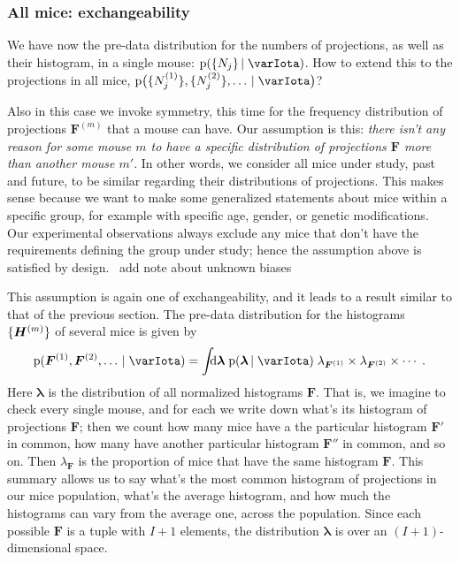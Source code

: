 \documentclass[\ifafour a4paper,12pt,\else a5paper,10pt,\fi%
onecolumn,oneside,article,%
british%
]{memoir}
\theoremstyle{remark}
\theoremstyle{innote}
\newcommand*{\di}{\mathrm{d}}%
\newcommand*{\pf}{\mathrm{p}}%
\renewcommand*{\|}[1][]{\nonscript\,#1\vert\nonscript\;\mathopen{}}
\newcommand*{\puzzle}{{\fontencoding{U}\fontfamily{fontawesometwo}\selectfont\symbol{225}}}
\newcommand{\mynote}[1]{ {\color{notecolour}\puzzle\ #1}}
\newcommand*{\yI}{\varIota}
\newcommand*{\yF}{\bm{F}}
\newcommand*{\yFm}[1][m]{\yF^{(#1)}}
\newcommand*{\yH}{\bm{H}}
\newcommand*{\yHm}[1][m]{\yH^{(#1)}}
\newcommand*{\yNm}[1][m]{N^{(#1)}}
\newcommand*{\yll}{\lambda}
\newcommand*{\yl}{\bm{\yll}}
\DeclarePairedDelimiter\tu{\{}{\}}
\begin{document}
\subsubsection{All mice: exchangeability}
\label{sec:allmice_exch}

We have now the pre-data distribution for the numbers of projections, as
well as their histogram, in a single mouse: $\pf(\tu{N_{j}} \| \yI)$. How
to extend this to the projections in all mice,
$\pf\bigl(\tu{\yNm[1]_{j}}, \tu{\yNm[2]_{j}}, \dotsc \| \yI\bigr)$?

Also in this case we invoke symmetry, this time for the frequency
distribution of projections $\yFm$ that a mouse can have. Our assumption is
this: \emph{there isn't any reason for some mouse $m$ to have a specific
  distribution of projections $\yF$ more than another mouse $m'$}. In other
words, we consider all mice under study, past and future, to be similar
regarding their distributions of projections. This makes sense because we
want to make some generalized statements about mice within a specific
group, for example with specific age, gender, or genetic modifications. Our
experimental observations always exclude any mice that don't have the
requirements defining the group under study; hence the assumption above is
satisfied by design. \mynote{add note about unknown biases}

This assumption is again one of exchangeability, and it leads to a result
similar to that of the previous section. The pre-data distribution for the
histograms $\tu{\yHm}$ of several mice is given by
\begin{equation}
  \label{eq:distr_H_mice}
  \pf( \yFm[1], \yFm[2], \dotsc \| \yI) =
  \int\!\!\!\di \yl\;
  \pf(\yl \| \yI)\;
  \yll_{\yFm[1]} \times \yll_{\yFm[2]} \times \dotsm\;.
\end{equation}
Here $\yl$ is the distribution of all normalized histograms $\yF$. That is,
we imagine to check every single mouse, and for each we write down what's
its histogram of projections $\yF$; then we count how many mice have a the
particular histogram $\yF'$ in common, how many have another particular
histogram $\yF''$ in common, and so on. Then $\yll_{\yF}$ is the proportion
of mice that have the same histogram $\yF$. This summary allows us to say
what's the most common histogram of projections in our mice population,
what's the average histogram, and how much the histograms can vary from the
average one, across the population. Since each possible $\yF$ is a tuple
with $I+1$ elements, the distribution $\yl$ is over an $(I+1)$-dimensional
space.
\end{document}
